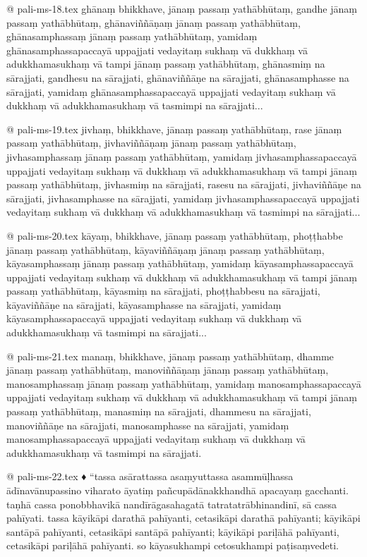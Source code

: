 @ pali-ms-18.tex
	ghānaṃ bhikkhave, jānaṃ passaṃ yathābhūtaṃ, gandhe jānaṃ passaṃ yathābhūtaṃ, ghānaviññāṇaṃ jānaṃ passaṃ yathābhūtaṃ, ghānasamphassaṃ jānaṃ passaṃ yathābhūtaṃ, yamidaṃ ghānasamphassapaccayā uppajjati vedayitaṃ sukhaṃ vā dukkhaṃ vā adukkhamasukhaṃ vā tampi jānaṃ passaṃ yathābhūtaṃ, ghānasmiṃ na sārajjati, gandhesu na sārajjati, ghānaviññāṇe na sārajjati, ghānasamphasse na sārajjati, yamidaṃ ghānasamphassapaccayā uppajjati vedayitaṃ sukhaṃ vā dukkhaṃ vā adukkhamasukhaṃ vā tasmimpi na sārajjati...

@ pali-ms-19.tex
	jivhaṃ, bhikkhave, jānaṃ passaṃ yathābhūtaṃ, rase jānaṃ passaṃ yathābhūtaṃ, jivhaviññāṇaṃ jānaṃ passaṃ yathābhūtaṃ, jivhasamphassaṃ jānaṃ passaṃ yathābhūtaṃ, yamidaṃ jivhasamphassapaccayā uppajjati vedayitaṃ sukhaṃ vā dukkhaṃ vā adukkhamasukhaṃ vā tampi jānaṃ passaṃ yathābhūtaṃ, jivhasmiṃ na sārajjati, rasesu na sārajjati, jivhaviññāṇe na sārajjati, jivhasamphasse na sārajjati, yamidaṃ jivhasamphassapaccayā uppajjati vedayitaṃ sukhaṃ vā dukkhaṃ vā adukkhamasukhaṃ vā tasmimpi na sārajjati...

@ pali-ms-20.tex
	kāyaṃ, bhikkhave, jānaṃ passaṃ yathābhūtaṃ, phoṭṭhabbe jānaṃ passaṃ yathābhūtaṃ, kāyaviññāṇaṃ jānaṃ passaṃ yathābhūtaṃ, kāyasamphassaṃ jānaṃ passaṃ yathābhūtaṃ, yamidaṃ kāyasamphassapaccayā uppajjati vedayitaṃ sukhaṃ vā dukkhaṃ vā adukkhamasukhaṃ vā tampi jānaṃ passaṃ yathābhūtaṃ, kāyasmiṃ na sārajjati, phoṭṭhabbesu na sārajjati, kāyaviññāṇe na sārajjati, kāyasamphasse na sārajjati, yamidaṃ kāyasamphassapaccayā uppajjati vedayitaṃ sukhaṃ vā dukkhaṃ vā adukkhamasukhaṃ vā tasmimpi na sārajjati...

@ pali-ms-21.tex
	manaṃ, bhikkhave, jānaṃ passaṃ yathābhūtaṃ, dhamme jānaṃ passaṃ yathābhūtaṃ, manoviññāṇaṃ jānaṃ passaṃ yathābhūtaṃ, manosamphassaṃ jānaṃ passaṃ yathābhūtaṃ, yamidaṃ manosamphassapaccayā uppajjati vedayitaṃ sukhaṃ vā dukkhaṃ vā adukkhamasukhaṃ vā tampi jānaṃ passaṃ yathābhūtaṃ, manasmiṃ na sārajjati, dhammesu na sārajjati, manoviññāṇe na sārajjati, manosamphasse na sārajjati, yamidaṃ manosamphassapaccayā uppajjati vedayitaṃ sukhaṃ vā dukkhaṃ vā adukkhamasukhaṃ vā tasmimpi na sārajjati.

@ pali-ms-22.tex
♦ “tassa asārattassa asaṃyuttassa asammūḷhassa ādīnavānupassino viharato āyatiṃ pañcupādānakkhandhā apacayaṃ gacchanti. taṇhā cassa ponobbhavikā nandīrāgasahagatā tatratatrābhinandinī, sā cassa pahīyati. tassa kāyikāpi darathā pahīyanti, cetasikāpi darathā pahīyanti; kāyikāpi santāpā pahīyanti, cetasikāpi santāpā pahīyanti; kāyikāpi pariḷāhā pahīyanti, cetasikāpi pariḷāhā pahīyanti. so kāyasukhampi cetosukhampi paṭisaṃvedeti.

